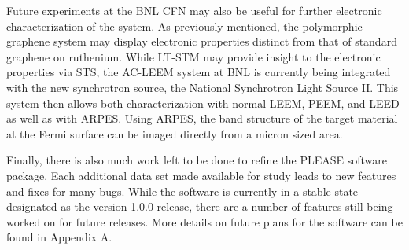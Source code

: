 Future experiments at the BNL CFN may also be useful for further electronic characterization of the system. As previously mentioned, the polymorphic graphene system may display electronic properties distinct from that of standard graphene on ruthenium. While LT-STM may provide insight to the electronic properties via STS, the AC-LEEM system at BNL is currently being integrated with the new synchrotron source, the National Synchrotron Light Source II. This system then allows both characterization with normal LEEM, PEEM, and LEED as well as with ARPES. Using ARPES, the band structure of the target material at the Fermi surface can be imaged directly from a micron sized area.

Finally, there is also much work left to be done to refine the PLEASE software package. Each additional data set made available for study leads to new features and fixes for many bugs. While the software is currently in a stable state designated as the version 1.0.0 release, there are a number of features still being worked on for future releases. More details on future plans for the software can be found in Appendix A.

